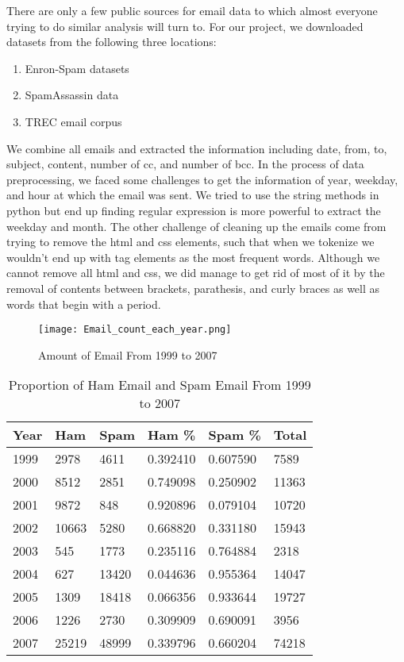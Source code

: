 
There are only a few public sources for email data to which almost everyone trying to do similar analysis will turn to. For our project, we downloaded datasets from the following three locations:

\begin{enumerate}
\item Enron-Spam datasets
\item SpamAssassin data
\item TREC email corpus
\end{enumerate} 

We combine all emails and extracted the information including date, from, to, subject, content, number of cc, and number of bcc. In the process of data preprocessing, we faced some challenges to get the information of year, weekday, and hour at which the email was sent. We tried to use the string methods in python but end up finding regular expression is more powerful to extract the weekday and month. The other challenge of cleaning up the emails come from trying to remove the html and css elements, such that when we tokenize we wouldn't end up with tag elements as the most frequent words. Although we cannot remove all html and css, we did manage to get rid of most of it by the removal of contents between brackets, parathesis, and curly braces as well as words that begin with a period. \\

\begin{figure}[h]
\texttt{[image: Email\_count\_each\_year.png]}
\centering
\caption{Amount of Email From 1999 to 2007}
\label{email_every_year}
\end{figure}

\begin{table}[h]
\centering
\caption{Proportion of Ham Email and Spam Email From 1999 to 2007}
\label{proportion_ham_spam}
\begin{tabular}{@{}llllll@{}}
\toprule
Year & Ham   & Spam  & Ham \%   & Spam \%  & Total \\ \midrule
1999 & 2978  & 4611  & 0.392410 & 0.607590 & 7589  \\
2000 & 8512  & 2851  & 0.749098 & 0.250902 & 11363 \\
2001 & 9872  & 848   & 0.920896 & 0.079104 & 10720 \\
2002 & 10663 & 5280  & 0.668820 & 0.331180 & 15943 \\
2003 & 545   & 1773  & 0.235116 & 0.764884 & 2318  \\
2004 & 627   & 13420 & 0.044636 & 0.955364 & 14047 \\
2005 & 1309  & 18418 & 0.066356 & 0.933644 & 19727 \\
2006 & 1226  & 2730  & 0.309909 & 0.690091 & 3956  \\
2007 & 25219 & 48999 & 0.339796 & 0.660204 & 74218 \\ \bottomrule
\end{tabular}
\end{table}

